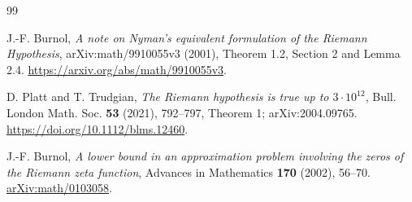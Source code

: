 \documentclass[11pt]{article}
\theoremstyle{remark}
\begin{document}
\begin{thebibliography}{99}
\begingroup\raggedright
{}
J.-F. Burnol, \emph{A note on Nyman's equivalent formulation of the
Riemann Hypothesis}, arXiv:math/9910055v3 (2001),
Theorem 1.2, Section 2 and Lemma 2.4.
\url{https://arxiv.org/abs/math/9910055v3}.



D. Platt and T. Trudgian,
\emph{The Riemann hypothesis is true up to $3\cdot10^{12}$},
Bull. London Math. Soc. \textbf{53} (2021), 792--797, Theorem 1;
arXiv:2004.09765.
\url{https://doi.org/10.1112/blms.12460}.
\par\endgroup

J.-F. Burnol,
\emph{A lower bound in an approximation problem involving the zeros of the Riemann zeta function},
Advances in Mathematics \textbf{170} (2002), 56--70.
\href{https://arxiv.org/abs/math/0103058}{arXiv:math/0103058}.

\end{thebibliography}
\end{document}
